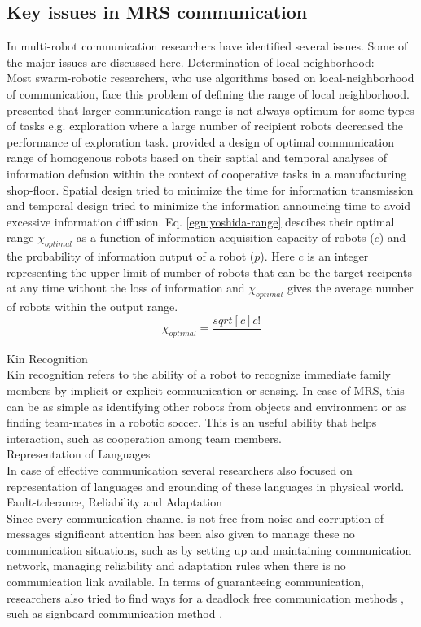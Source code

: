 \subsection{Key issues in MRS communication}
In multi-robot communication researchers have identified several issues. Some of the major issues are discussed here.
Determination of local neighborhood:\\
Most swarm-robotic researchers, who use algorithms based on local-neighborhood of communication,  face this problem of defining the range of local neighborhood.  presented that  larger communication range is not always optimum for some types of tasks e.g. exploration where a large number of recipient robots  decreased the performance of exploration task.  provided a design of optimal communication range of homogenous robots based on their saptial and temporal analyses of information defusion  within the context of cooperative tasks in a manufacturing shop-floor. Spatial design  tried to minimize the time for information transmission and temporal design tried to minimize the information announcing time to avoid excessive information diffusion. Eq. \ref{egn:yoshida-range} descibes their optimal range $\chi_{optimal}$ as a function of information acquisition capacity of robots ($c$) and the probability of information output of a robot ($p$). Here $c$ is an integer representing the upper-limit of number of robots that can be the target recipents at any time without the loss of information and  $\chi_{optimal}$ gives the average number of robots within the output range.
\begin{equation}
\chi_{optimal} = \frac{sqrt [c] {c!}}{}
\end{equation}


Kin Recognition\\
Kin recognition refers to the ability of a robot to recognize immediate family members by implicit or explicit communication or sensing. In case of MRS, this can be as simple as identifying other robots from objects and environment or as finding team-mates in a robotic soccer. This is an useful ability that helps interaction, such as cooperation among team members. \\
Representation of Languages\\
In case of effective communication several researchers also focused on representation of languages and grounding of these languages in physical world.\\
Fault-tolerance, Reliability and Adaptation\\
Since every communication channel is not free from noise and corruption of messages significant attention has been also given to manage these no communication situations, such as by setting up and maintaining communication network, managing reliability and adaptation rules when there is no communication link available. In terms of guaranteeing communication, researchers also tried to find ways for a deadlock free communication methods \cite{Arkin1998}, such as signboard communication method \cite{Wang1989}.


